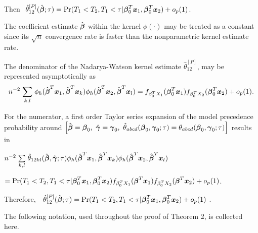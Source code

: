 \documentclass[12pt]{article}
\newcommand{\bmx}{\mbox{\boldmath $x$}}
\newcommand{\bg}{\mbox{\boldmath $\gamma$}}
\newcommand{\bb}{\mbox{\boldmath $\beta$}}
\def\stackunder#1#2{\mathrel{\mathop{#2}\limits_{#1}}}
\begin{document}
\noindent \hspace{0.30in} Then $\ \hat{\theta}_{12}^{[P]}(\hat{\bb};\tau) = \mbox{Pr}(T_1 < T_2, T_1 < \tau |\bb_0^T \bmx_1, \bb_0^T \bmx_2) + o_p(1) $. 


\vskip 0.25in



\noindent The coefficient estimate $\hat{\bb}$ within the kernel $\phi(\cdot)$ may be treated as a constant since its $\sqrt{n}$ convergence rate is faster than the nonparametric kernel estimate rate.

\bigskip
 
\noindent The denominator of the Nadarya-Watson kernel estimate $\hat{\theta}^{[P]}_{12}$, may be represented asymptotically as
\[  n^{-2} \stackunder{k, l}{\sum} \phi_h(\hat{\bb}^T\bmx_{1},\hat{\bb}^T\bmx_{k}) \phi_h(\hat{\bb}^T\bmx_{2},\hat{\bb}^T\bmx_{l}) = f_{\beta_0^T X_1}(\bb_0^T \bmx_1)  f_{\beta_0^T X_2}(\bb_0^T \bmx_2) + o_p(1) .\]

\vskip 0.25in

\noindent For the numerator, a first order Taylor series expansion of the model precedence probability around $\left[\hat{\bb} = \bb_0, \ \hat{\bg} = \bg_0, \ \hat{\theta}_{abcd}(\bb_{0},\bg_{0};\tau ) = \theta_{abcd}(\bb_{0}, \bg_0;\tau )\right]$ results in

\bigskip  

\noindent \hspace{0.50in}$   n^{-2} \stackunder{k, l }{\sum} \hat{\theta}_{12kl}(\hat{\bb},\hat{\bg};\tau) \phi_h(\hat{\bb}^T\bmx_{1},\hat{\bb}^T\bmx_{k}) \phi_h(\hat{\bb}^T\bmx_{2},\hat{\bb}^T\bmx_{l}) $

\noindent \hspace{0.50in}$ = \mbox{Pr}(T_1 < T_2, T_1 < \tau |\bb_0^T \bmx_1, \bb_0^T \bmx_2) f_{\beta_0^T X_1}(\bb^T \bmx_1)  f_{\beta_0^T X_2}(\bb^T \bmx_2) + o_p(1) $.

\bigskip

\noindent Therefore, $ \ \ \hat{\theta}_{12}^{[P]}(\hat{\bb};\tau) = \mbox{Pr}(T_1 < T_2, T_1 < \tau |\bb_0^T \bmx_1, \bb_0^T \bmx_2) + o_p(1)$ . 


\newpage



\bigskip

\noindent The following notation, used throughout the proof of Theorem 2, is collected here. 

\bigskip
\end{document}
